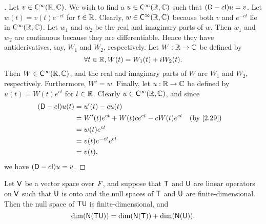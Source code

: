 \begin{proof}[]
  Let \(v \in \cfs[\infty](\R, \C)\).
  We wish to find a \(u \in \cfs[\infty](\R, \C)\) such that \((\Dop - c \IT) u = v\).
  Let \(w(t) = v(t) e^{-ct}\) for \(t \in \mathbb{R}\).
  Clearly, \(w \in \cfs[\infty](\R, \C)\) because both \(v\) and \(e^{-ct}\) lie in \(\cfs[\infty](\R, \C)\).
  Let \(w_1\) and \(w_2\) be the real and imaginary parts of \(w\).
  Then \(w_1\) and \(w_2\) are continuous because they are differentiable.
  Hence they have antiderivatives, say, \(W_1\) and \(W_2\), respectively.
  Let \(W : \mathbb{R} \to \mathbb{C}\) be defined by
  \[
    \forall t \in \mathbb{R}, W(t) = W_1(t) + i W_2(t).
  \]
  Then \(W \in \cfs[\infty](\R, \C)\), and the real and imaginary parts of \(W\) are \(W_1\) and \(W_2\), respectively.
  Furthermore, \(W' = w\).
  Finally, let \(u : \mathbb{R} \to \mathbb{C}\) be defined by \(u(t) = W(t) e^{ct}\) for \(t \in \mathbb{R}\).
  Clearly \(u \in \cfs[\infty](\R, \C)\), and since
  \begin{align*}
    (\Dop - c \IT) u(t) & = u'(t) - cu(t)                                               \\
                        & = W'(t) e^{ct} + W(t) c e^{ct} - c W(t) e^{ct} &  & \by{2.29} \\
                        & = w(t) e^{ct}                                                 \\
                        & = v(t) e^{-ct} e^{ct}                                         \\
                        & = v(t),
  \end{align*}
  we have \((\Dop - c \IT) u = v\).
\end{proof}

\begin{lem}\label{2.7.12}
  Let \(\mathsf{V}\) be a vector space over \(\mathit{F}\), and suppose that \(\mathsf{T}\) and \(\mathsf{U}\) are linear operators on \(\mathsf{V}\) such that \(\mathsf{U}\) is onto and the null spaces of \(\mathsf{T}\) and \(\mathsf{U}\) are finite-dimensional.
  Then the null space of \(\mathsf{T} \mathsf{U}\) is finite-dimensional, and
  \[
    \dim(\ns{\T \U}) = \dim(\ns{\T}) + \dim(\ns{\U}).
  \]
\end{lem}

